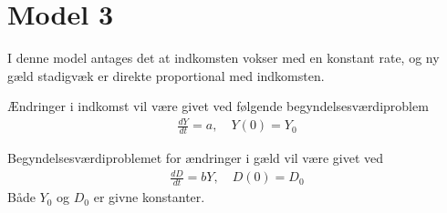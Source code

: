 \section{Model 3}
I denne model antages det at indkomsten vokser med en konstant rate, og ny gæld stadigvæk er direkte proportional med indkomsten. 

Ændringer i indkomst vil være givet ved følgende begyndelsesværdiproblem
\begin{align}
    \frac{dY}{dt} = a, \quad Y(0) = Y_0
\end{align}

Begyndelsesværdiproblemet for ændringer i gæld vil være givet ved
\begin{align}
    \frac{dD}{dt} = bY, \quad D(0) = D_0
\end{align}
Både $Y_0$ og $D_0$ er givne konstanter. 